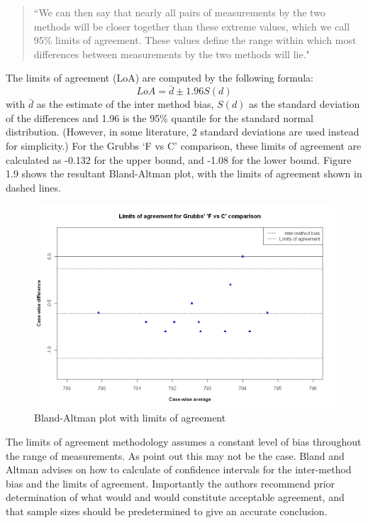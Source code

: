 \documentclass[12pt, a4paper]{report}
\theoremstyle{plain}
\theoremstyle{definition}
\theoremstyle{remark}
\begin{document}
\begin{quote} ``We can then say that nearly all pairs
	of measurements by the two methods will be closer together than
	these extreme values, which we call 95\% limits of agreement.
	These values define the range within which most differences
	between measurements by the two methods will lie."
\end{quote}

The limits of agreement (LoA) are computed by the following
formula:
\begin{equation}
	LoA = \bar{d} \pm 1.96 S(d)
\end{equation}
with $\bar{d}$ as the estimate of the inter method bias, $S(d)$ as
the standard deviation of the differences and 1.96 is the 95\%
quantile for the standard normal distribution. (However, in some
literature, 2 standard deviations are used instead for
simplicity.) For the Grubbs `F vs C' comparison, these limits of
agreement are calculated as -0.132 for the upper bound, and -1.08
for the lower bound. Figure 1.9 shows the resultant Bland-Altman
plot, with the limits of agreement shown in dashed lines.


\begin{figure}[h!]
	\begin{center}
		\includegraphics[width=125mm]{images/GrubbsBAplot-LOA.jpeg}
		\caption{Bland-Altman plot with limits of agreement}\label{GrubbsBAplot-noLOA}
	\end{center}
\end{figure}

The limits of agreement methodology assumes a constant level of
bias throughout the range of measurements. As \citet*{BA86} point
out this may not be the case. Bland and Altman advises on how to
calculate of confidence intervals for the inter-method bias and
the limits of agreement. Importantly the authors recommend prior
determination of what would and would constitute acceptable
agreement, and that sample sizes should be predetermined to give
an accurate conclusion.
\end{document}
